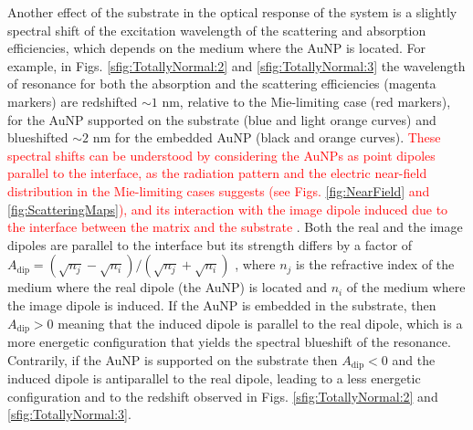 Another effect of the substrate in the optical response of the system is a slightly spectral shift of the excitation wavelength of the scattering and absorption efficiencies, which depends on the medium where the AuNP is located. For example, in Figs. \ref{sfig:TotallyNormal:2} and \ref{sfig:TotallyNormal:3} the wavelength of resonance for both the absorption and the scattering efficiencies (magenta markers)  are redshifted $\sim 1$ nm, relative to the Mie-limiting case (red markers), for the AuNP supported on the substrate (blue and light orange curves) and blueshifted $\sim 2$ nm for the embedded AuNP (black and orange curves). \textcolor{red}{These spectral shifts can be understood by considering the AuNPs as point dipoles parallel to the interface, as the radiation pattern and the electric near-field distribution in the Mie-limiting cases suggests (see Figs. \ref{fig:NearField} and \ref{fig:ScatteringMaps}), and its interaction with the image dipole induced due to the interface between the matrix and the substrate \cite{meng_anisotropic_2015}}. Both the real and the image dipoles are parallel to the interface but its strength differs by  a factor of $A_\text{dip} = (\sqrt{n_j}-\sqrt{n_i}) / (\sqrt{n_j}+\sqrt{n_i})$ \cite{barrera1991optical}, where $n_{j}$ is the refractive index of the medium where the real dipole (the AuNP) is located and $n_i$ of the medium where the image dipole is induced. If the AuNP is embedded in the substrate, then $A_\text{dip}>0$ meaning that the induced dipole is parallel to the real dipole, which is a more energetic configuration that yields the spectral blueshift of the resonance. Contrarily, if the AuNP is supported on the substrate then $A_\text{dip}<0$ and the induced dipole is antiparallel to the real dipole, leading to a less energetic configuration and to the redshift observed in Figs. \ref{sfig:TotallyNormal:2} and \ref{sfig:TotallyNormal:3}.%

